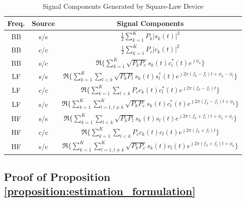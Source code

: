 \documentclass{IEEEtran}
\begin{document}
\begin{table}
\caption{Signal Components Generated by Square-Law Device}
\centering
\begin{tabular}{|c|c|c|}
\hline 
Freq. & Source & Signal Components \tabularnewline
\hline 
\hline  
BB & s/s & $\frac{1}{2}\sum\limits_{k=1}^{K} P_k|s_k(t)|^2$ \tabularnewline
\hline 
BB & c/c & $\frac{1}{2}\sum\limits_{k=1}^{K}P_c |c_k(t)|^2$ \tabularnewline
\hline 
BB & s/c & $\Re \{\sum\limits_{k=1}^{K}\sqrt{ P_kP_c}s_k(t)c^*_i(t)e^{\jmath \phi_k}\}$ \tabularnewline
\hline 
LF & s/s & $\Re \{\sum\limits_{k=1}^{K}\sum\limits_{l<k} \sqrt{P_kP_l}s_k(t)s^*_l(t)e^{\jmath 2\pi(f_k-f_l)t+\phi_k-\phi_l}\}$ \tabularnewline
\hline 
LF & c/c & $\Re \{\sum\limits_{k=1}^{K}\sum\limits_{l<k}P_c c_k(t)c^*_l(t)e^{\jmath 2\pi(f_k-f_l)t}\}$ \tabularnewline
\hline 
LF & s/c & $\Re \{\sum\limits_{k=1}^{K}\sum\limits_{l=1,l\neq k}^{K}\sqrt{ P_kP_c}s_k(t)c^*_l(t)e^{\jmath 2\pi(f_k-f_l)t+\phi_k}\}$ \tabularnewline
\hline 
HF & s/s & $\Re \{\sum\limits_{k=1}^{K}\sum\limits_{l<k} \sqrt{P_kP_l}s_k(t)s_l(t)e^{\jmath 2\pi(f_k+f_l)t+\phi_k+\phi_l}\}$ \tabularnewline
\hline 
HF & c/c & $\Re \{\sum\limits_{k=1}^{K}\sum\limits_{l<k}P_c c_k(t)c_l(t)e^{\jmath 2\pi(f_k+f_l)t}\}$ \tabularnewline
\hline 
HF & s/c & $\Re \{\sum\limits_{k=1}^{K}\sum\limits_{l=1,l\neq k}^{K}\sqrt{ P_kP_c}s_k(t)c_l(t)e^{\jmath 2\pi(f_k+f_l)t+\phi_k}\}$ \tabularnewline
\hline 
\end{tabular}
\label{tab:components_in_y}
\end{table}

%
%
\subsection{Proof of Proposition \ref{proposition:estimation_formulation}}
\label{sec:proof_estimation_formulation_rc}



%
%
\end{document}
